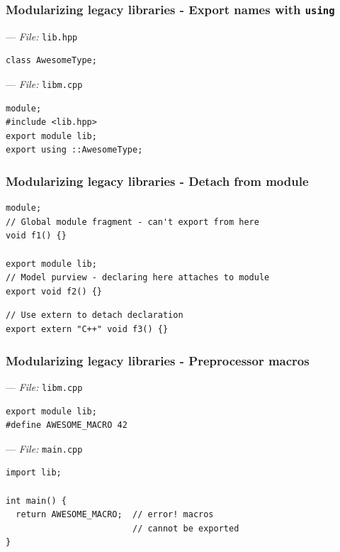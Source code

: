 \documentclass[aspectratio=169]{beamer}
\newif\iftransitions
\newcommand{\cpause}{\iftransitions \pause \fi}
\begin{document}
\begin{frame}[fragile]
  \frametitle{Modularizing legacy libraries - Export names with \texttt{using}}

  --- \textit{File:} \texttt{lib.hpp}
  \begin{lstlisting}[style=cpp20]
class AwesomeType;
  \end{lstlisting}
  --- \textit{File:} \texttt{libm.cpp}
  \begin{lstlisting}[style=cpp20]
module;
#include <lib.hpp>
export module lib;
export using ::AwesomeType;
  \end{lstlisting}

\end{frame}

\begin{frame}[fragile]
  \frametitle{Modularizing legacy libraries - Detach from module}

  \begin{lstlisting}[style=cpp20]
module;
// Global module fragment - can't export from here
void f1() {}

export module lib;
// Model purview - declaring here attaches to module
export void f2() {}
  \end{lstlisting}

  \cpause
  \begin{lstlisting}[style=cpp20]
// Use extern to detach declaration
export extern "C++" void f3() {}
  \end{lstlisting}
\end{frame}

\begin{frame}[fragile]
  \frametitle{Modularizing legacy libraries - Preprocessor macros}

  --- \textit{File:} \texttt{libm.cpp}
  \begin{lstlisting}[style=cpp20]
export module lib;
#define AWESOME_MACRO 42
  \end{lstlisting}

  --- \textit{File:} \texttt{main.cpp}
  \begin{lstlisting}[style=cpp20]
import lib;

int main() {
  return AWESOME_MACRO;  // error! macros
                         // cannot be exported
}
  \end{lstlisting}

\end{frame}
\end{document}
